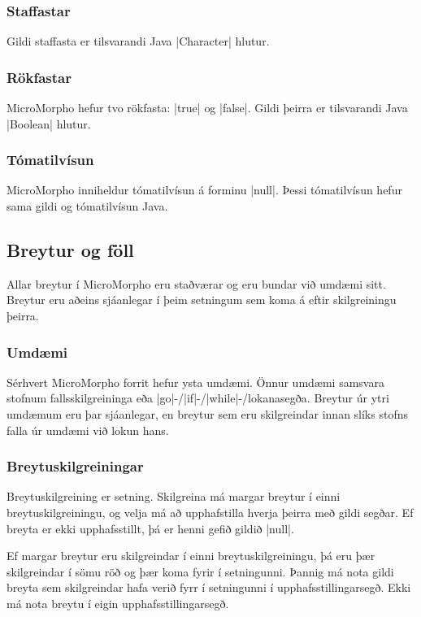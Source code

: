 \documentclass[12pt]{article}
\begin{document}
\subsubsection{Staffastar}
Gildi staffasta er tilsvarandi Java |Character| hlutur.

\subsubsection{Rökfastar}
MicroMorpho hefur tvo rökfasta: |true| og |false|.
Gildi þeirra er tilsvarandi Java |Boolean| hlutur.

\subsubsection{Tómatilvísun}
MicroMorpho inniheldur tómatilvísun á forminu |null|.
Þessi tómatilvísun hefur sama gildi og tómatilvísun Java.

\subsection{Breytur og föll}
Allar breytur í MicroMorpho eru staðværar og eru bundar við umdæmi sitt.
Breytur eru aðeins sjáanlegar í þeim setningum sem koma á eftir skilgreiningu þeirra.

\subsubsection{Umdæmi}
Sérhvert MicroMorpho forrit hefur ysta umdæmi.
Önnur umdæmi samsvara stofnum fallsskilgreininga
eða |go|-/|if|-/|while|-/lokanasegða.
Breytur úr ytri umdæmum eru þar sjáanlegar, en
breytur sem eru skilgreindar innan slíks stofns falla úr umdæmi við lokun hans.

\subsubsection{Breytuskilgreiningar}
Breytuskilgreining er setning. Skilgreina má margar breytur í einni breytuskilgreiningu,
og velja má að upphafstilla hverja þeirra með gildi segðar.
Ef breyta er ekki upphafsstillt, þá er henni gefið gildið |null|.

Ef margar breytur eru skilgreindar í einni breytuskilgreiningu,
þá eru þær skilgreindar í sömu röð og þær koma fyrir í setningunni.
Þannig má nota gildi breyta sem skilgreindar hafa verið fyrr í setningunni
í upphafsstillingarsegð.
Ekki má nota breytu í eigin upphafsstillingarsegð.
\end{document}
